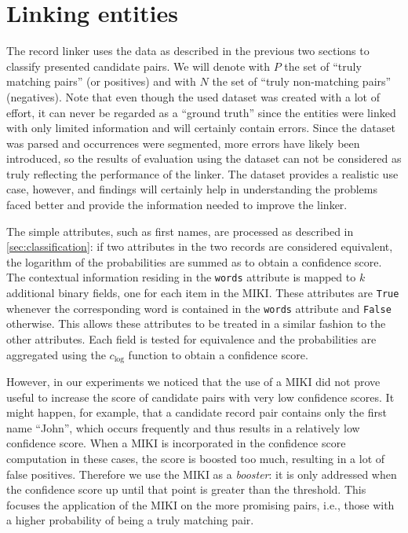 

\section{Linking entities}
\label{sec:linking_entities}

The record linker uses the data as described in the previous two sections to classify presented candidate pairs.
We will denote with $P$ the set of ``truly matching pairs'' (or positives) and with $N$ the set of ``truly non-matching pairs'' (negatives).
Note that even though the used dataset was created with a lot of effort, it can never be regarded as a ``ground truth'' since the entities were linked with only limited information and will certainly contain errors.
Since the dataset was parsed and occurrences were segmented, more errors have likely been introduced, so the results of evaluation using the dataset can not be considered as truly reflecting the performance of the linker.
The dataset provides a realistic use case, however, and findings will certainly help in understanding the problems faced better and provide the information needed to improve the linker.

The simple attributes, such as first names, are processed as described in \cref{sec:classification}: if two attributes in the two records are considered equivalent, the logarithm of the probabilities are summed as to obtain a confidence score.
The contextual information residing in the \texttt{words} attribute is mapped to $k$ additional binary fields, one for each item in the MIKI.
These attributes are \texttt{True} whenever the corresponding word is contained in the \texttt{words} attribute and \texttt{False} otherwise.
This allows these attributes to be treated in a similar fashion to the other attributes.
Each field is tested for equivalence and the probabilities are aggregated using the $c_{\mathrm{log}}$ function to obtain a confidence score.

However, in our experiments we noticed that the use of a MIKI did not prove useful to increase the score of candidate pairs with very low confidence scores.
It might happen, for example, that a candidate record pair contains only the first name ``John'', which occurs frequently and thus results in a relatively low confidence score.
When a MIKI is incorporated in the confidence score computation in these cases, the score is boosted too much, resulting in a lot of false positives.
Therefore we use the MIKI as a \emph{booster}: it is only addressed when the confidence score up until that point is greater than the threshold.
This focuses the application of the MIKI on the more promising pairs, i.e., those with a higher probability of being a truly matching pair.

